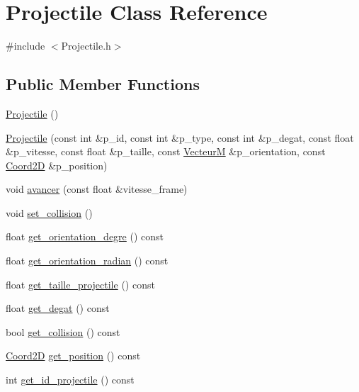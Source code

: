 \hypertarget{classProjectile}{}\section{Projectile Class Reference}
\label{classProjectile}


{\ttfamily \#include $<$Projectile.\+h$>$}

\subsection*{Public Member Functions}
\begin{DoxyCompactItemize}
\item 
\hyperlink{classProjectile_ac536ed2aad56af866a2078b9a85aa16d}{Projectile} ()
\item 
\hyperlink{classProjectile_a40d61808d12cb84127d768ead95d7b24}{Projectile} (const int \&p\+\_\+id, const int \&p\+\_\+type, const int \&p\+\_\+degat, const float \&p\+\_\+vitesse, const float \&p\+\_\+taille, const \hyperlink{classVecteurM}{VecteurM} \&p\+\_\+orientation, const \hyperlink{classCoord2D}{Coord2D} \&p\+\_\+position)
\item 
void \hyperlink{classProjectile_a7284639815c2d8f7d852ff3872851fa5}{avancer} (const float \&vitesse\+\_\+frame)
\item 
void \hyperlink{classProjectile_a137391002869c50a97504992033915ac}{set\+\_\+collision} ()
\item 
float \hyperlink{classProjectile_af114e853c019123fd3cbf208352afbd5}{get\+\_\+orientation\+\_\+degre} () const 
\item 
float \hyperlink{classProjectile_a03627709f7fa134cae85c7480e8b8de4}{get\+\_\+orientation\+\_\+radian} () const 
\item 
float \hyperlink{classProjectile_a77d1976107d1c7a15e7ba5298d80defb}{get\+\_\+taille\+\_\+projectile} () const 
\item 
float \hyperlink{classProjectile_a5696bb5c597c5a6af1524ba6f8fe7386}{get\+\_\+degat} () const 
\item 
bool \hyperlink{classProjectile_a4e22cdf491c89cb27ebd31532afdd753}{get\+\_\+collision} () const 
\item 
\hyperlink{classCoord2D}{Coord2D} \hyperlink{classProjectile_a5576e84397fff82a93ee85c5cc80591c}{get\+\_\+position} () const 
\item 
int \hyperlink{classProjectile_a1c03ac1041f4ff2955b67e5a3e2e8787}{get\+\_\+id\+\_\+projectile} () const 
\end{DoxyCompactItemize}


